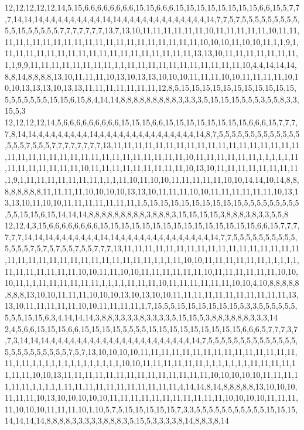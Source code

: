 12,12,12,12,12,14,5,15,6,6,6,6,6,6,6,6,15,15,6,6,6,15,15,15,15,15,15,15,15,6,6,15,5,7,7,7,14,14,14,4,4,4,4,4,4,4,4,4,14,14,4,4,4,4,4,4,4,4,4,4,4,4,4,14,7,7,5,7,5,5,5,5,5,5,5,5,5,5,5,15,5,5,5,5,5,7,7,7,7,7,7,7,13,7,13,10,11,11,11,11,11,11,10,11,11,11,11,11,10,11,11,11,11,1,11,11,11,11,11,11,11,11,11,11,11,11,11,11,11,11,10,10,10,11,10,10,11,1,1,9,1,11,11,11,11,11,11,11,11,11,11,11,11,11,11,11,11,11,11,13,13,10,11,11,11,11,11,11,11,1,1,9,9,11,11,11,11,11,11,11,11,1,1,11,11,11,11,11,11,11,11,11,11,11,10,4,4,14,14,14,8,8,14,8,8,8,8,13,10,11,11,11,10,13,10,13,13,10,10,10,11,11,11,10,10,11,11,11,11,10,10,10,13,13,13,10,13,13,11,11,11,11,11,11,11,12,8,5,15,15,15,15,15,15,15,15,15,15,15,5,5,5,5,5,5,5,15,15,6,15,8,4,14,14,8,8,8,8,8,8,8,8,8,3,3,3,3,5,15,15,15,5,5,5,3,5,5,8,3,3,15,5,3
12,12,12,12,14,5,6,6,6,6,6,6,6,6,6,15,15,15,6,6,15,15,15,15,15,15,15,15,6,6,6,15,7,7,7,7,8,14,14,4,4,4,4,4,4,4,4,14,4,4,4,4,4,4,4,4,4,4,4,4,4,4,4,14,8,7,5,5,5,5,5,5,5,5,5,5,5,5,5,5,5,5,7,5,5,5,7,7,7,7,7,7,7,7,13,11,11,11,11,11,11,11,11,11,11,11,11,11,11,11,11,11,11,11,11,11,11,11,11,11,11,11,11,11,11,11,11,11,11,11,10,11,11,11,11,11,11,1,1,1,1,1,11,11,11,11,11,11,11,11,10,11,11,11,11,11,11,11,11,11,10,13,10,11,11,11,11,11,11,11,11,1,9,1,11,11,11,11,11,11,11,1,1,1,11,10,11,10,10,11,11,11,11,11,10,10,14,14,10,14,8,8,8,8,8,8,8,8,11,11,11,11,10,10,10,10,13,13,10,11,11,11,10,10,11,11,11,11,11,11,10,13,13,13,10,11,10,10,11,11,11,11,11,11,11,1,5,15,15,15,15,15,15,15,15,15,5,5,5,5,5,5,5,5,5,5,5,15,15,6,15,14,14,14,8,8,8,8,8,8,8,8,8,3,8,8,8,3,15,15,15,15,3,8,8,8,3,8,3,3,5,5,8
12,12,4,3,15,6,6,6,6,6,6,6,6,15,15,15,15,15,15,15,15,15,15,15,15,15,15,15,6,6,15,7,7,7,7,7,7,14,14,14,4,4,4,4,4,4,4,14,14,4,4,4,4,4,4,4,4,4,4,4,4,4,4,14,7,7,5,5,5,5,5,5,5,5,5,5,5,5,5,5,7,5,7,5,7,5,5,7,5,5,7,7,7,13,11,11,11,11,11,11,11,11,11,11,11,11,11,11,11,11,11,11,11,11,11,11,11,11,11,11,11,11,11,11,11,1,1,1,11,10,10,11,11,11,11,11,11,1,1,1,1,1,11,11,11,11,11,11,11,10,10,11,11,10,10,11,11,11,11,11,11,10,11,11,11,11,11,11,10,10,10,11,1,1,11,11,11,11,11,11,1,1,1,1,11,11,11,10,11,11,11,11,11,11,10,10,4,10,8,8,8,8,8,8,8,8,13,10,10,11,11,11,10,10,10,13,10,13,10,10,11,11,11,11,11,11,11,11,11,11,11,13,13,10,11,11,11,11,11,10,10,11,11,11,11,1,7,15,5,5,15,15,15,15,15,15,5,3,3,5,5,5,5,5,5,5,5,5,15,15,6,3,4,14,14,14,3,8,8,3,3,3,3,8,3,3,3,3,5,15,15,5,3,8,8,3,8,8,8,3,3,3,14
2,4,5,6,6,15,15,15,6,6,15,15,15,15,5,5,5,5,15,15,15,15,15,15,15,15,15,6,6,6,5,7,7,7,3,7,7,3,14,14,14,4,4,4,4,4,4,4,4,4,4,4,4,4,4,4,4,4,4,4,4,4,4,14,7,5,5,5,5,5,5,5,5,5,5,5,5,5,5,5,5,5,5,5,5,5,5,5,5,7,5,7,13,10,10,10,10,11,11,11,11,11,11,11,11,11,11,11,11,11,11,11,11,1,11,1,1,1,1,1,1,1,1,1,1,1,1,1,1,10,10,11,11,11,11,11,11,1,1,1,1,1,1,1,11,11,11,11,11,11,11,10,10,13,11,11,11,11,11,11,11,11,11,11,11,11,11,11,10,10,10,10,10,11,11,11,11,11,11,1,1,1,1,1,11,11,11,11,11,11,11,11,11,11,11,4,14,14,8,14,8,8,8,8,8,13,10,10,10,11,11,11,10,13,10,10,10,10,10,11,11,11,11,11,11,11,11,11,11,11,10,10,10,10,11,11,11,11,10,10,10,11,11,11,10,1,10,5,7,5,15,15,15,15,15,7,3,3,5,5,5,5,5,5,5,5,5,5,5,15,15,15,14,14,14,14,8,8,8,8,3,3,3,3,3,8,8,8,3,5,15,5,3,3,3,3,8,14,8,8,3,8,14
